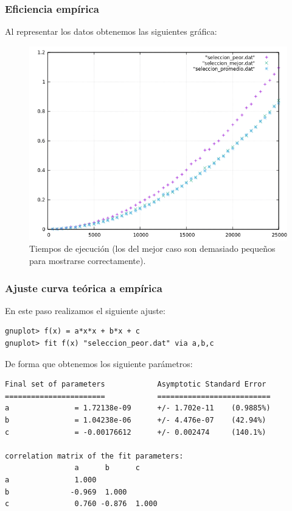 \subsubsection{Eficiencia empírica}

Al representar los datos obtenemos las siguientes gráfica:

\begin{figure}[H]
    \begin{center}
        \includegraphics[scale=0.7]{imagenes/g_s.png}
        \caption{Tiempos de ejecución (los del mejor caso son demasiado pequeños para mostrarse correctamente).}
        \label{fig8}
    \end{center}
\end{figure}

\subsubsection{Ajuste curva teórica a empírica}

En este paso realizamos el siguiente ajuste:
\begin{shaded*}
\begin{verbatim}
gnuplot> f(x) = a*x*x + b*x + c
gnuplot> fit f(x) "seleccion_peor.dat" via a,b,c
\end{verbatim}
\end{shaded*}

De forma que obtenemos los siguiente parámetros:

\begin{shaded*}
\begin{verbatim}
Final set of parameters            Asymptotic Standard Error
=======================            ==========================
a               = 1.72138e-09      +/- 1.702e-11    (0.9885%)
b               = 1.04238e-06      +/- 4.476e-07    (42.94%)
c               = -0.00176612      +/- 0.002474     (140.1%)

correlation matrix of the fit parameters:
                a      b      c      
a               1.000 
b              -0.969  1.000 
c               0.760 -0.876  1.000 

\end{verbatim}
\end{shaded*}

